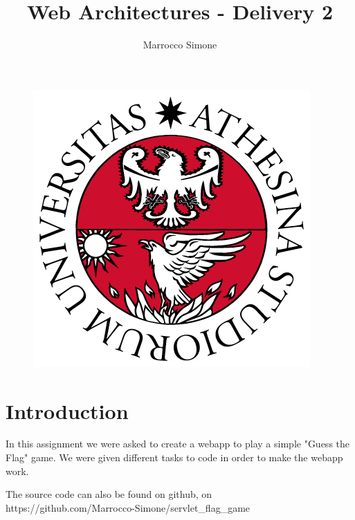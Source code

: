 \documentclass[12pt, a4paper]{article}
\title{Web Architectures - Delivery 2}
\author{Marrocco Simone}
\begin{document}
  \maketitle
  \begin{figure}[H]
    \centering
    \includegraphics[scale=0.35]{unitn.png}
  \end{figure}
  \tableofcontents
  \pagebreak

  \section{Introduction}
  In this assignment we were asked to create a webapp to play a simple "Guess the Flag" game. We were given different tasks to code in order to make the webapp work.

  The source code can also be found on github, on \\
  https://github.com/Marrocco-Simone/servlet\_flag\_game

  
  
  
  
  

  \pagebreak
  
\end{document}
